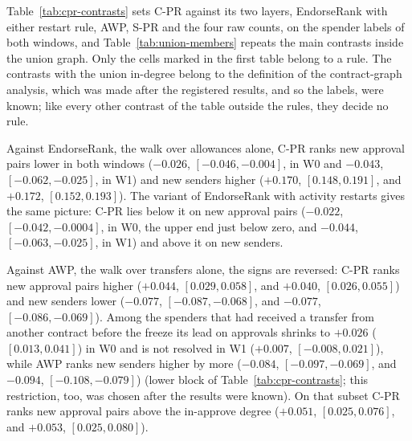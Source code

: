 
Table~\ref{tab:cpr-contrasts} sets \mbox{C-PR} against its two layers, EndorseRank with either restart rule, AWP, \mbox{S-PR} and the four raw counts, on the spender labels of both windows, and Table~\ref{tab:union-members} repeats the main contrasts inside the union graph. Only the cells marked in the first table belong to a rule. The contrasts with the union in-degree belong to the definition of the contract-graph analysis, which was made after the registered results, and so the labels, were known; like every other contrast of the table outside the rules, they decide no rule.





Against EndorseRank, the walk over allowances alone, \mbox{C-PR} ranks new approval pairs lower in both windows ($-0.026$, $[-0.046,-0.004]$, in W0 and $-0.043$, $[-0.062,-0.025]$, in W1) and new senders higher ($+0.170$, $[0.148,0.191]$, and $+0.172$, $[0.152,0.193]$). The variant of EndorseRank with activity restarts gives the same picture: \mbox{C-PR} lies below it on new approval pairs ($-0.022$, $[-0.042,-0.0004]$, in W0, the upper end just below zero, and $-0.044$, $[-0.063,-0.025]$, in W1) and above it on new senders.

Against AWP, the walk over transfers alone, the signs are reversed: \mbox{C-PR} ranks new approval pairs higher ($+0.044$, $[0.029,0.058]$, and $+0.040$, $[0.026,0.055]$) and new senders lower ($-0.077$, $[-0.087,-0.068]$, and $-0.077$, $[-0.086,-0.069]$). Among the spenders that had received a transfer from another contract before the freeze its lead on approvals shrinks to $+0.026$ ($[0.013,0.041]$) in W0 and is not resolved in W1 ($+0.007$, $[-0.008,0.021]$), while AWP ranks new senders higher by more ($-0.084$, $[-0.097,-0.069]$, and $-0.094$, $[-0.108,-0.079]$) (lower block of Table~\ref{tab:cpr-contrasts}; this restriction, too, was chosen after the results were known). On that subset \mbox{C-PR} ranks new approval pairs above the in-approve degree ($+0.051$, $[0.025,0.076]$, and $+0.053$, $[0.025,0.080]$).

